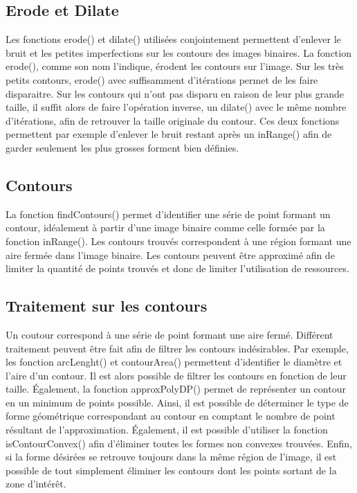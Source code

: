 \subsection{Erode et Dilate}

Les fonctions erode() et dilate() utilisées conjointement permettent d'enlever le bruit et les petites imperfections sur les contours des images binaires. La fonction erode(), comme son nom l'indique, érodent les contours sur l'image. Sur les très petits contours, erode() avec suffisamment d'itérations permet de les faire disparaitre. Sur les contours qui n'ont pas disparu en raison de leur plus grande taille, il suffit alors de faire l'opération inverse, un dilate() avec le même nombre d'itérations, afin de retrouver la taille originale du contour. Ces deux fonctions permettent par exemple d'enlever le bruit restant après un inRange() afin de garder seulement les plus grosses forment bien définies.

\subsection{Contours}

La fonction findContours() permet d'identifier une série de point formant un contour, idéalement à partir d'une image binaire comme celle formée par la fonction inRange(). Les contours trouvés correspondent à une région formant une aire fermée dans l'image binaire. Les contours peuvent être approximé afin de limiter la quantité de points trouvés et donc de limiter l'utilisation de ressources.

\subsection{Traitement sur les contours}

Un coutour correspond à une série de point formant une aire fermé. Différent traitement peuvent être fait afin de filtrer les contours indésirables. Par exemple, les fonction arcLenght() et contourArea() permettent d'identifier le diamètre et l'aire d'un contour. Il est alors possible de filtrer les contours en fonction de leur taille. Également, la fonction approxPolyDP() permet de représenter un contour en un minimum de points possible. Ainsi, il est possible de déterminer le type de forme géométrique correspondant au contour en comptant le nombre de point résultant de l'approximation. Également, il est possible d'utiliser la fonction isContourConvex() afin d'éliminer toutes les formes non convexes trouvées. Enfin, si la forme désirées se retrouve toujours dans la même région de l'image, il est possible de tout simplement éliminer les contours dont les points sortant de la zone d'intérêt.
